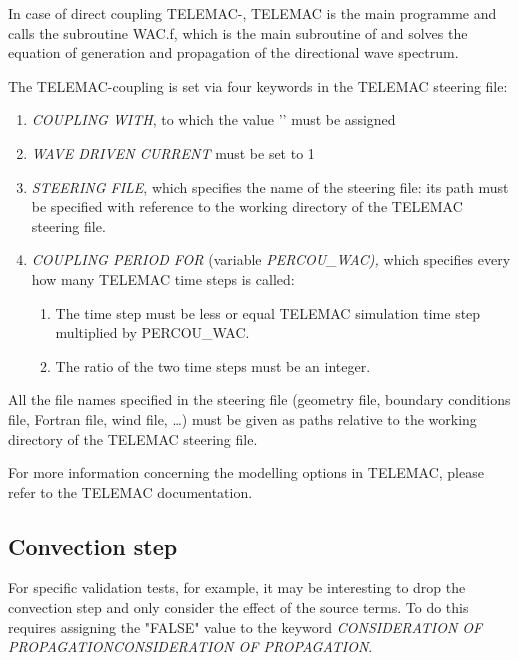  In case of direct coupling TELEMAC-\tomawac, TELEMAC is the main programme and calls the \tomawac subroutine WAC.f, which is the main subroutine of \tomawac and solves the equation of generation and propagation of the directional wave spectrum.

 The TELEMAC-\tomawac coupling is set via four keywords in the TELEMAC steering file:

\begin{enumerate}
\item  \textit{COUPLING WITH}, to which the value '\tomawac' must be assigned

\item  \textit{WAVE DRIVEN CURRENT} must be set to 1

\item  \textit{\tomawac STEERING FILE}, which specifies the name of the \tomawac steering file: its path must be specified with reference to the working directory of the TELEMAC steering file.

\item  \textit{COUPLING PERIOD FOR \tomawac} (variable \textit{PERCOU\_WAC),} which specifies every how many TELEMAC time steps \tomawac is called:

\begin{enumerate}
\item  The \tomawac time step must be less or equal TELEMAC simulation time step multiplied by PERCOU\_WAC.

\item  The ratio of the two time steps must be an integer.
\end{enumerate}
\end{enumerate}

 All the file names specified in the \tomawac steering file (geometry file, boundary conditions file, Fortran file, wind file, \dots ) must be given as paths relative to the working directory of the TELEMAC steering file.

 For more information concerning the modelling options in TELEMAC, please refer to the TELEMAC documentation.


\subsection{ Convection step}

 For specific validation tests, for example, it may be interesting to drop the convection step and only consider the effect of the source terms. To do this requires assigning the "FALSE" value to the keyword \textit{CONSIDERATION OF PROPAGATIONCONSIDERATION OF PROPAGATION}.


